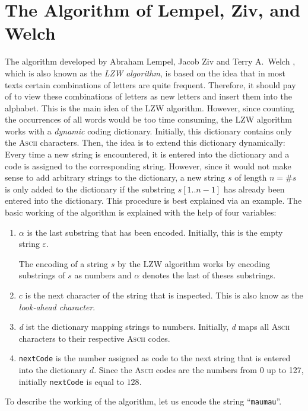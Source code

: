\section{The Algorithm  of Lempel, Ziv, and Welch}
The algorithm developed by Abraham Lempel, Jacob Ziv \cite{ziv:77,ziv:78} and Terry A.~Welch
\cite{welch:84}, which is also known as the \emph{LZW algorithm}, is based on the idea that in most
texts certain combinations of letters are quite frequent.  Therefore, it should pay of to view
these combinations of letters as new letters and insert them into the alphabet.  This is the main
idea of the LZW algorithm.  However, since counting the occurrences of all words would be too time
consuming, the LZW algorithm works with a \emph{dynamic} coding dictionary.  Initially, this dictionary
contains only the \textsc{Ascii} characters.  Then, the idea is to extend this dictionary
dynamically: Every time a new string is encountered, it is entered into the dictionary and a code is
assigned to the corresponding string.  However, since it would not make sense to add arbitrary
strings to the dictionary, a new string $s$ of length $n=\#s$ is only added to the dictionary if the
substring $s[1..n-1]$ has already been entered into the dictionary.  This procedure is best
explained via an example.  The basic working of the algorithm is explained with the help of four
variables:
\begin{enumerate}
\item $\alpha$ is the last substring that has been encoded.  Initially, this is the empty string
      $\varepsilon$.
  
      The encoding of a string $s$ by the LZW algorithm works by encoding substrings of $s$ as
      numbers and $\alpha$ denotes the last of theses substrings.
\item $c$ is the next character of the string that is inspected.  This is also know as the
      \emph{look-ahead character}.
\item \textsl{d} ist the dictionary mapping strings to numbers.  Initially, \textsl{d} maps all
      \textsc{Ascii} characters to their respective \textsc{Ascii} codes.
\item \texttt{nextCode} is the number assigned as code to the next string that is entered into
      the dictionary $d$.  Since the \textsc{Ascii} codes are the numbers from 0 up to 127,
      initially \texttt{nextCode} is equal to $128$.
\end{enumerate}
To describe the working of the algorithm, let us encode the string ``\texttt{maumau}''.
